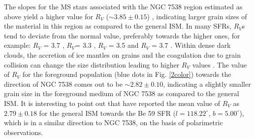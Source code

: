 \documentclass[a4paper,fleqn,usenatbib,useAMS]{mnras}
\begin{document}
The slopes for the MS stars associated with the NGC 7538 region estimated as above yield a higher 
value for $R_V$ ($\sim3.85\pm0.15$) \citep[for a description on reddening law estimation, see][]{2003AA...397..191P}, 
indicating larger grain sizes of the material in this region as compared to the general ISM.
In many SFRs, $R_V$s tend to deviate from the normal value, preferably towards the higher ones,
for example: $R_V$ = 3.7 \citep[][the Carina region]{2014A&A...567A.109K}, $R_V$= 3.3 \citep[][NGC 1931]{2013ApJ...764..172P},
$R_V$ = 3.5 \citep[][NGC  281]{2012PASJ...64..107S} and $R_V$ = 3.7 \citep[][Be 59]{2008MNRAS.383.1241P}.
Within dense dark clouds, the accretion of ice
mantles on grains and the coagulation due to grain collision can change the size distribution
leading to higher $R_V$ values \citep{1989ApJ...345..245C}.
The value of $R_V$ for the foreground population (blue dots in Fig. \ref{2color}) towards the direction of NGC 7538 
comes out to be $\sim2.82\pm0.10$,
indicating a slightly smaller grain size in the foreground medium of NGC 7538 as compared to the general ISM.
It is interesting to point out that 
\citet{2012MNRAS.419.2587E} have reported the mean value of $R_V$ as $2.79\pm0.18$ for the general ISM towards the Be 59 SFR ($l=118.22^\circ$, $b=5.00^\circ$), which is in a similar direction to NGC 7538, on the basis of polarimetric observations.   




\bsp    %
\label{lastpage}
\end{document}
